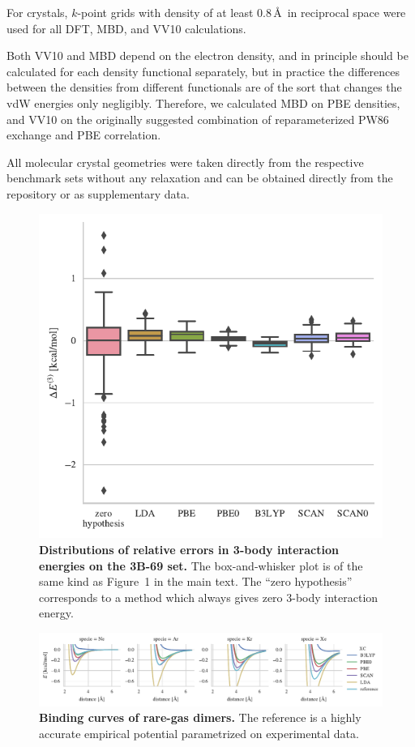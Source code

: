 \documentclass[twocolumn]{article}
\begin{document}
For crystals, $k$-point grids with density of at least 0.8\,\AA\ in reciprocal space were used for all DFT, MBD, and VV10 calculations.

Both VV10 and MBD depend on the electron density, and in principle should be calculated for each density functional separately, but in practice the differences between the densities from different functionals are of the sort that changes the vdW energies only negligibly.
Therefore, we calculated MBD on PBE densities, and VV10 on the originally suggested combination of reparameterized PW86 exchange and PBE correlation.

All molecular crystal geometries were taken directly from the respective benchmark sets without any relaxation and can be obtained directly from the repository or as supplementary data.

\begin{figure}
\includegraphics[center]{media/3-body}
\caption{\textbf{Distributions of relative errors in 3-body interaction energies on the 3B-69 set.}
The box-and-whisker plot is of the same kind as Figure~1 in the main text.
The ``zero hypothesis'' corresponds to a method which always gives zero 3-body interaction energy.
}\label{fig:3-body}
\end{figure}

\begin{figure}
\includegraphics[center]{media/mbd-rare-gas}
\caption{\textbf{Binding curves of rare-gas dimers.}
The reference is a highly accurate empirical potential parametrized on experimental data.
}\label{fig:mbd-rare-gas}
\end{figure}
\end{document}
